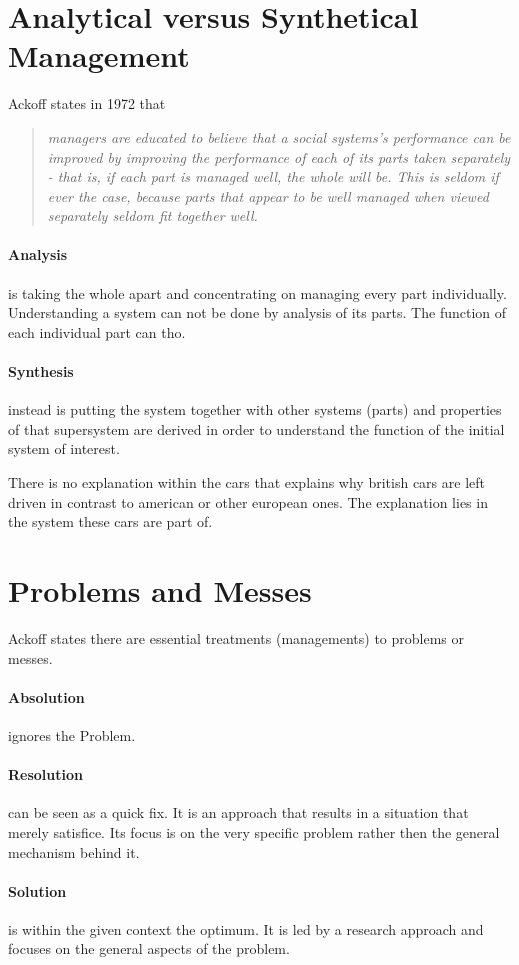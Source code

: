\documentclass{scrartcl}
\begin{document}
\section{Analytical versus Synthetical Management}
Ackoff states in 1972 \cite{ackoff1994systems} that
\begin{quote}
	\itshape
	managers are educated to believe that a social systems's performance can be improved by improving the performance of each of its parts taken separately - that is, if each part is managed well, the whole will be. This is seldom if ever the case, because parts that appear to be well managed when viewed separately seldom fit together well.
\end{quote} 

\paragraph{Analysis} is taking the whole apart and concentrating on managing every part individually. Understanding a system can not be done by analysis of its parts. The function of each individual part can tho.
\paragraph{Synthesis} instead is putting the system together with other systems (parts) and properties of that supersystem are derived in order to understand the function of the initial system of interest.


There is no explanation within the cars that explains why british cars are left driven in contrast to american or other european ones. The explanation lies in the system these cars are part of. 
\section{Problems and Messes}
Ackoff states there are essential treatments (managements) to problems or messes. 
\paragraph{Absolution} ignores the Problem.
\paragraph{Resolution} can be seen as a quick fix. It is an approach that results in a situation that merely satisfice. Its focus is on the very specific problem rather then the general mechanism behind it.
\paragraph{Solution} is within the given context the optimum. It is led by a research approach and focuses on the general aspects of the problem.
\end{document}
